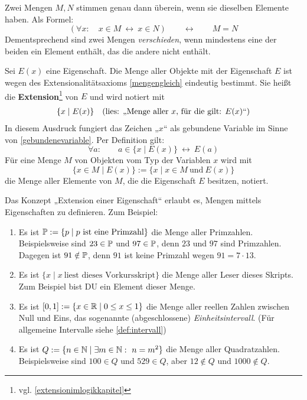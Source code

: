 \begin{axiom} \label{mengengleich} 
    Zwei Mengen $M,N$ stimmen genau dann überein, wenn sie dieselben Elemente haben. Als Formel:
        \[ (\forall x:\quad x\in M\ \leftrightarrow\ x\in N)\qquad\leftrightarrow\qquad M=N\]
    Dementsprechend sind zwei Mengen \emph{verschieden}, wenn mindestens eine der beiden ein Element enthält, das die andere nicht enthält.
\end{axiom}


\begin{defin} \label{def:extension} 
    Sei $E(x)$ eine Eigenschaft. Die Menge aller Objekte mit der Eigenschaft $E$ ist wegen des Extensionalitätsaxioms \cref{mengengleich} eindeutig bestimmt. Sie heißt die \textbf{Extension}\footnote{vgl. \cref{extensionimlogikkapitel}} von $E$ und wird notiert mit
    \begin{align*}
        \{ x\mid E(x) \} && (\textnormal{lies: „Menge aller $x$, für die gilt: $E(x)$“})
    \end{align*}
    In diesem Ausdruck fungiert das Zeichen „$x$“ als gebundene Variable im Sinne von \cref{gebundenevariable}. Per Definition gilt:
        \[ \forall a:\qquad a\in \{x\mid E(x)\} \ \leftrightarrow\ E(a) \]
    Für eine Menge $M$ von Objekten vom Typ der Variablen $x$ wird mit
        \[ \{ x\in M\mid E(x) \} := \{ x\mid x\in M\ \text{und}\ E(x)\} \]
    die Menge aller Elemente von $M$, die die Eigenschaft $E$ besitzen, notiert.
\end{defin}


\begin{bsp} \label{bsp:extension}
    Das Konzept „Extension einer Eigenschaft“ erlaubt es, Mengen mittels Eigenschaften zu definieren. Zum Beispiel:
    \begin{enumerate}
        \item Es ist $\mathbb P := \{p\mid p\ \text{ist eine Primzahl}\}$ die Menge aller Primzahlen. Beispielsweise sind $23\in \mathbb P$ und $97\in\mathbb P$, denn $23$ und $97$ sind Primzahlen. Dagegen ist $91\notin \mathbb P$, denn $91$ ist keine Primzahl wegen $91=7\cdot 13$.
        \item Es ist $\{ x\mid x\ \text{liest dieses Vorkursskript} \}$ die Menge aller Leser dieses Skripts. Zum Beispiel bist DU ein Element dieser Menge.
        \item Es ist $[0,1] := \{ x\in \mathbb R \mid 0\le x\le 1\}$ die Menge aller reellen Zahlen zwischen Null und Eins, das sogenannte (abgeschlossene) \emph{Einheitsintervall}. (Für allgemeine Intervalle siehe \cref{def:intervall})
        \item Es ist $Q:=\{ n\in \mathbb N \mid \exists m\in \mathbb N:\ n=m^2 \}$ die Menge aller Quadratzahlen. Beispielsweise sind $100\in Q$ und $529\in Q$, aber $12\notin Q$ und $1000\notin Q$.
    \end{enumerate}
\end{bsp}


